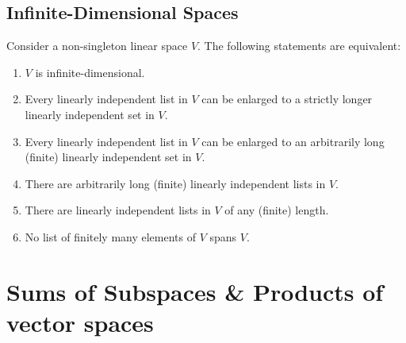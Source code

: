 \documentclass{book}
\theoremstyle{definition}
\begin{document}
\section{Infinite-Dimensional Spaces}
Consider a non-singleton linear space $V$. The following statements are equivalent:
\begin{enumerate}
	\item $V$ is infinite-dimensional.
	\item Every linearly independent list in $V$ can be enlarged to a strictly longer linearly independent set in $V$.
	\item Every linearly independent list in $V$ can be enlarged to an arbitrarily long (finite) linearly independent set in $V$.
	\item There are arbitrarily long (finite) linearly independent lists in $V$.
	\item There are linearly independent lists in $V$ of any (finite) length.
	\item No list of finitely many elements of $V$ spans $V$.
\end{enumerate}
\newpage
\chapter{Sums of Subspaces \& Products of vector spaces}
\end{document}
